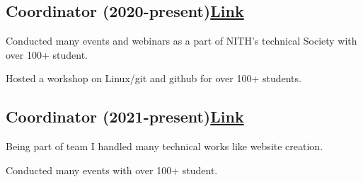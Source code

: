 \documentclass[a4paper,12pt]{article}
\begin{document}


\vspace*{4pt}
\subsection{{Coordinator (2020-present)}\hfill \href{https://www.istenith.com/}{\textbf{Link}}} %
\begin{zitemize}
\item Conducted many events and webinars as a part of NITH’s technical Society with over 100+ student.
\item Hosted a workshop on Linux/git and github for over 100+ students.
\end{zitemize}

\vspace*{4pt}
\subsection{{Coordinator (2021-present)}\hfill \href{https://chelix.festnimbus.com/}{\textbf{Link}}} %
\begin{zitemize}
\item Being part of team I handled many technical works like website creation.
\item Conducted many events with over 100+ student.
\end{zitemize}
\end{document}

